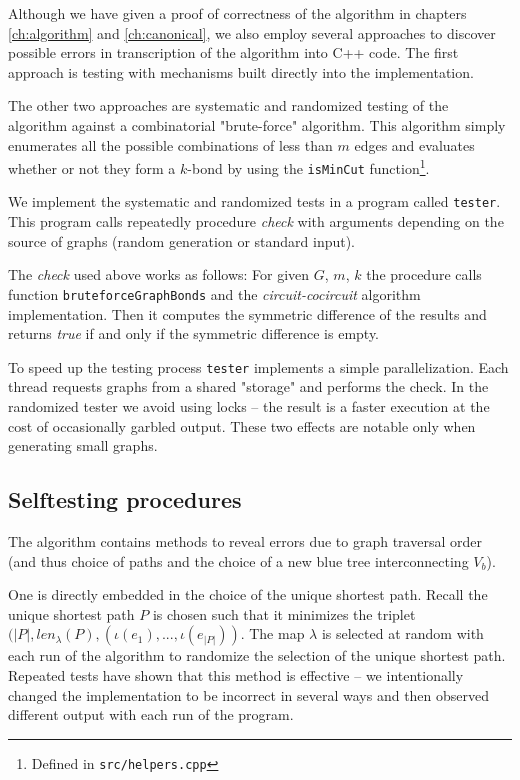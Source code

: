 Although we have given a proof of correctness of the algorithm in chapters \ref{ch:algorithm} and \ref{ch:canonical}, we also employ several approaches to discover possible errors in transcription of the algorithm into C++ code. The first approach is testing with mechanisms built directly into the implementation.

The other two approaches are systematic and randomized testing of the algorithm against a combinatorial "brute-force" algorithm. This algorithm simply enumerates all the possible combinations of less than $m$ edges and evaluates whether or not they form a $k$-bond by using the \lstinline|isMinCut| function\footnote{Defined in \lstinline|src/helpers.cpp|}.

We implement the systematic and randomized tests in a program called \lstinline|tester|. This program calls repeatedly procedure \textit{check} with arguments depending on the source of graphs (random generation or standard input).

The \textit{check} used above works as follows: For given $G$, $m$, $k$ the procedure calls function \lstinline|bruteforceGraphBonds| and the \textit{circuit-cocircuit} algorithm implementation. Then it computes the symmetric difference of the results and returns \textit{true} if and only if the symmetric difference is empty.

To speed up the testing process \lstinline|tester| implements a simple parallelization. Each thread requests graphs from a shared "storage" and performs the check. In the randomized tester we avoid using locks -- the result is a faster execution at the cost of occasionally garbled output. These two effects are notable only when generating small graphs.


\subsection*{Selftesting procedures}

The algorithm contains methods to reveal errors due to graph traversal order (and thus choice of paths and the choice of a new blue tree interconnecting $V_b$).

One is directly embedded in the choice of the unique shortest path. Recall the unique shortest path $P$ is chosen such that it minimizes the triplet $(\lvert P \rvert, len_\lambda(P), (\iota(e_1), ...,\iota(e_{\lvert P \rvert}))$. The map $\lambda$ is selected at random with each run of the algorithm to randomize the selection of the unique shortest path. Repeated tests have shown that this method is effective -- we intentionally changed the implementation to be incorrect in several ways and then observed different output with each run of the program.

